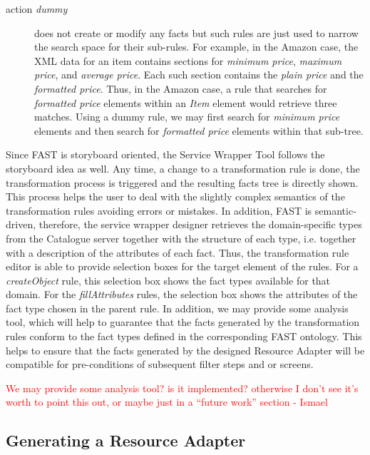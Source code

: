 \documentclass{fast_latex}
\begin{document}
{\begin{description}
	\item[action \emph{dummy}] does not create or modify any facts but such rules are just used to narrow the search space for their sub-rules. For example, in the Amazon case, the XML data for an item contains sections for \emph{minimum price}, \emph{maximum price}, and \emph{average price}. Each such section contains the \emph{plain price} and the \emph{formatted price}. Thus, in the Amazon case, a rule that searches for \emph{formatted price} elements within an \emph{Item} element would retrieve three matches. Using a dummy rule, we may first search for \emph{minimum price} elements and then search for \emph{formatted price} elements within that sub-tree.
\end{description}

Since FAST is storyboard oriented, the Service Wrapper Tool follows the storyboard idea as well. Any time, a change to a transformation rule is done, the transformation process is triggered and the resulting facts tree is directly shown. This process helps the user to deal with the slightly complex semantics of the transformation rules avoiding errors or mistakes. In addition, FAST is semantic-driven, therefore, the service wrapper designer retrieves the domain-specific types from the Catalogue server together with the structure of each type, i.e. together with a description of the attributes of each fact. Thus, the transformation rule editor is able to provide selection boxes for the target element of the rules. For a \emph{createObject} rule, this selection box shows the fact types available for that domain. For the \emph{fillAttributes} rules, the selection box shows the attributes of the fact type chosen in the parent rule. In addition, we may provide some analysis tool, which will help to guarantee that the facts generated by the transformation rules conform to the fact types defined in the corresponding FAST ontology. This helps to ensure that the facts generated by the designed Resource Adapter will be compatible for pre-conditions of subsequent filter steps and or screens.

\textcolor{red}{We may provide some analysis tool? is it implemented? otherwise I don't see it's worth to point this out, or maybe just in a ``future work'' section - Ismael}



\subsection{Generating a Resource Adapter} %
\label{sub:generating_a_resource_adapter}

}
\end{document}

